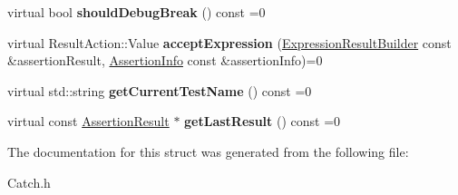 \begin{DoxyCompactItemize}
\item 
\hypertarget{struct_catch_1_1_i_result_capture_a7839e422ccd55f298cd64f0bf4a5938b}{virtual bool {\bfseries should\-Debug\-Break} () const =0}\label{struct_catch_1_1_i_result_capture_a7839e422ccd55f298cd64f0bf4a5938b}

\item 
\hypertarget{struct_catch_1_1_i_result_capture_a76e0229ceb19405d2dd4a868ce0a1cdf}{virtual Result\-Action\-::\-Value {\bfseries accept\-Expression} (\hyperlink{class_catch_1_1_expression_result_builder}{Expression\-Result\-Builder} const \&assertion\-Result, \hyperlink{struct_catch_1_1_assertion_info}{Assertion\-Info} const \&assertion\-Info)=0}\label{struct_catch_1_1_i_result_capture_a76e0229ceb19405d2dd4a868ce0a1cdf}

\item 
\hypertarget{struct_catch_1_1_i_result_capture_aea1617f4a84cc648246aa3ed6918b5bf}{virtual std\-::string {\bfseries get\-Current\-Test\-Name} () const =0}\label{struct_catch_1_1_i_result_capture_aea1617f4a84cc648246aa3ed6918b5bf}

\item 
\hypertarget{struct_catch_1_1_i_result_capture_ab18872c89fab97405a56e9c6a4919736}{virtual const \hyperlink{class_catch_1_1_assertion_result}{Assertion\-Result} $\ast$ {\bfseries get\-Last\-Result} () const =0}\label{struct_catch_1_1_i_result_capture_ab18872c89fab97405a56e9c6a4919736}

\end{DoxyCompactItemize}


The documentation for this struct was generated from the following file\-:\begin{DoxyCompactItemize}
\item 
Catch.\-h\end{DoxyCompactItemize}
